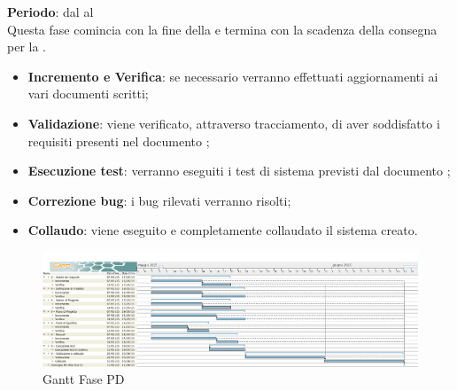 	\textbf{Periodo}: dal  al  \\Questa fase comincia con la fine della  e termina con la scadenza della consegna per la .
	\begin{itemize}
		\item \textbf{Incremento e Verifica}: se necessario verranno effettuati aggiornamenti ai vari documenti scritti;
		\item \textbf{Validazione}: viene verificato, attraverso tracciamento, di aver soddisfatto i requisiti presenti nel documento ;
		\item \textbf{Esecuzione test}: verranno eseguiti i test di sistema previsti dal documento ;
		\item \textbf{Correzione bug}: i bug rilevati verranno risolti;
		\item \textbf{Collaudo}: viene eseguito e completamente collaudato il sistema creato.
	\end{itemize}
		\begin{figure}[H]\centering
			\includegraphics[width=\textwidth]{PianoDiProgetto/Pics/FasePD.png}
		\caption{Gantt Fase PD}
\end{figure}
